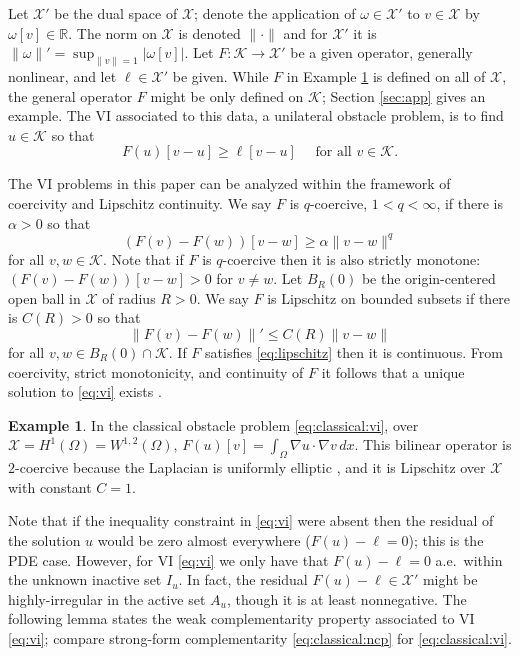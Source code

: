 \documentclass[]{interact}
\theoremstyle{plain}%
\theoremstyle{definition}
\newtheorem{example}[theorem]{Example}
\theoremstyle{remark}
\newcommand{\RR}{\mathbb{R}}
\newcommand{\grad}{\nabla}
\newcommand{\cK}{\mathcal{K}}
\newcommand{\cX}{\mathcal{X}}
\begin{document}
Let $\cX'$ be the dual space of $\cX$; denote the application of $\omega \in \cX'$ to $v\in \cX$ by $\omega[v] \in \RR$.  The norm on $\cX$ is denoted $\|\cdot\|$ and for $\cX'$ it is $\|\omega\|' = \sup_{\|v\|=1} |\omega[v]|$.  Let $F:\cK \to \cX'$ be a given operator, generally nonlinear, and let $\ell\in \cX'$ be given.  While $F$ in Example \ref{example:classicalobstacle} is defined on all of $\cX$, the general operator $F$ might be only defined on $\cK$; Section \ref{sec:app} gives an example.  The VI associated to this data, a unilateral obstacle problem, is to find $u\in \cK$ so that
\begin{equation} \label{eq:vi}
F(u)[v - u] \ge \ell[v - u] \quad \text{ for all } v \in \cK.
\end{equation}

The VI problems in this paper can be analyzed within the framework of coercivity and Lipschitz continuity.  We say $F$ is $q$-coercive, $1<q<\infty$, if there is $\alpha>0$ so that
\begin{equation} \label{eq:coercive}
(F(v) - F(w))[v - w] \ge \alpha \|v-w\|^q
\end{equation}
for all $v,w \in \cK$.  Note that if $F$ is $q$-coercive then it is also strictly monotone: $(F(v) - F(w))[v - w] > 0$ for $v\ne w$.  Let $B_R(0)$ be the origin-centered open ball in $\cX$ of radius $R>0$.  We say $F$ is Lipschitz on bounded subsets if there is $C(R)>0$ so that
\begin{equation} \label{eq:lipschitz}
\|F(v)-F(w)\|' \le C(R) \|v-w\|
\end{equation}
for all $v,w \in B_R(0)\cap \cK$.  If $F$ satisfies \eqref{eq:lipschitz} then it is continuous.  From coercivity, strict monotonicity, and continuity of $F$ it follows that a unique solution to \eqref{eq:vi} exists \cite[Corollary III.1.8]{KinderlehrerStampacchia1980}.

\begin{example}  \label{example:classicalobstacle}
In the classical obstacle problem \eqref{eq:classical:vi}, over $\cX=H^1(\Omega)=W^{1,2}(\Omega)$, $F(u)[v] = \int_\Omega \grad u\cdot \grad v\,dx$.  This bilinear operator is $2$-coercive because the Laplacian is uniformly elliptic \cite{Evans2010}, and it is Lipschitz over $\cX$ with constant $C=1$.
\end{example}

Note that if the inequality constraint in \eqref{eq:vi} were absent then the residual of the solution $u$ would be zero almost everywhere ($F(u)-\ell=0$); this is the PDE case.  However, for VI \eqref{eq:vi} we only have that $F(u)-\ell=0$ a.e.~within the unknown inactive set $I_u$.  In fact, the residual $F(u)-\ell\in \cX'$ might be highly-irregular in the active set $A_u$, though it is at least nonnegative.  The following lemma states the weak complementarity property associated to VI \eqref{eq:vi}; compare strong-form complementarity \eqref{eq:classical:ncp} for \eqref{eq:classical:vi}.
\end{document}
